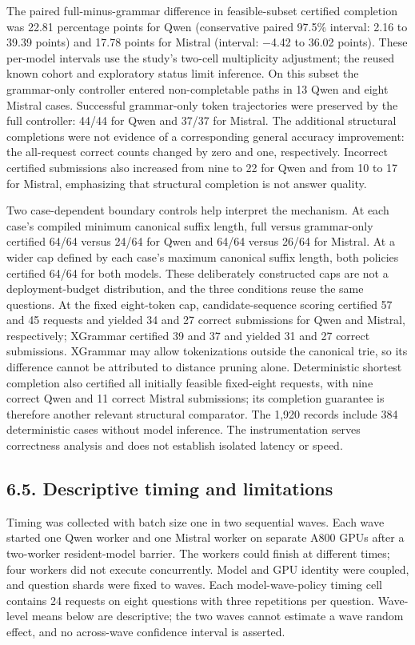 \documentclass[
  12pt,
  a4paper,
]{article}
\begin{document}
The paired full-minus-grammar difference in feasible-subset certified completion was 22.81 percentage points for Qwen (conservative paired 97.5\% interval: 2.16 to 39.39 points) and 17.78 points for Mistral (interval: $-$4.42 to 36.02 points). These per-model intervals use the study's two-cell multiplicity adjustment; the reused known cohort and exploratory status limit inference. On this subset the grammar-only controller entered non-completable paths in 13 Qwen and eight Mistral cases. Successful grammar-only token trajectories were preserved by the full controller: 44/44 for Qwen and 37/37 for Mistral. The additional structural completions were not evidence of a corresponding general accuracy improvement: the all-request correct counts changed by zero and one, respectively. Incorrect certified submissions also increased from nine to 22 for Qwen and from 10 to 17 for Mistral, emphasizing that structural completion is not answer quality.

Two case-dependent boundary controls help interpret the mechanism. At each case's compiled minimum canonical suffix length, full versus grammar-only certified 64/64 versus 24/64 for Qwen and 64/64 versus 26/64 for Mistral. At a wider cap defined by each case's maximum canonical suffix length, both policies certified 64/64 for both models. These deliberately constructed caps are not a deployment-budget distribution, and the three conditions reuse the same questions. At the fixed eight-token cap, candidate-sequence scoring certified 57 and 45 requests and yielded 34 and 27 correct submissions for Qwen and Mistral, respectively; XGrammar certified 39 and 37 and yielded 31 and 27 correct submissions. XGrammar may allow tokenizations outside the canonical trie, so its difference cannot be attributed to distance pruning alone. Deterministic shortest completion also certified all initially feasible fixed-eight requests, with nine correct Qwen and 11 correct Mistral submissions; its completion guarantee is therefore another relevant structural comparator. The 1,920 records include 384 deterministic cases without model inference. The instrumentation serves correctness analysis and does not establish isolated latency or speed.

\subsection{6.5. Descriptive timing and limitations}

Timing was collected with batch size one in two sequential waves. Each wave started one Qwen worker and one Mistral worker on separate A800 GPUs after a two-worker resident-model barrier. The workers could finish at different times; four workers did not execute concurrently. Model and GPU identity were coupled, and question shards were fixed to waves. Each model-wave-policy timing cell contains 24 requests on eight questions with three repetitions per question. Wave-level means below are descriptive; the two waves cannot estimate a wave random effect, and no across-wave confidence interval is asserted.
\end{document}
